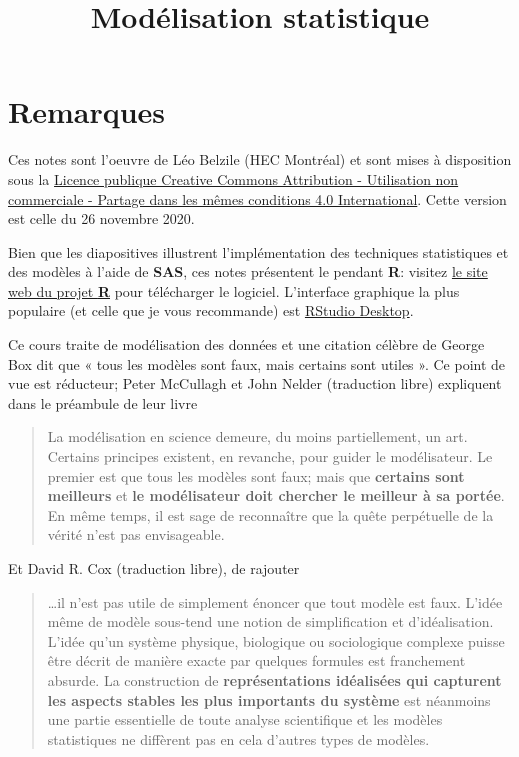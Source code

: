 \documentclass[
  11pt,
  letterpaper,
]{article}
\title{Modélisation statistique}
\author{}
\date{\vspace{-2.5em}}
\let\oldhref\href
\renewcommand{\href}[2]{#2\footnote{\url{#1}}}
\theoremstyle{definition}
\theoremstyle{definition}
\theoremstyle{definition}
\theoremstyle{remark}
\begin{document}
\maketitle

\let\href\oldhref

{
\setcounter{tocdepth}{2}
\tableofcontents
}
\hypertarget{remarques}{%
\section*{Remarques}\label{remarques}}

Ces notes sont l'oeuvre de Léo Belzile (HEC Montréal) et sont mises à disposition sous la \href{https://creativecommons.org/licenses/by-nc-sa/4.0/legalcode.fr}{Licence publique Creative Commons Attribution - Utilisation non commerciale - Partage dans les mêmes conditions 4.0 International}. Cette version est celle du 26 novembre 2020.

Bien que les diapositives illustrent l'implémentation des techniques statistiques et des modèles à l'aide de \textbf{SAS}, ces notes présentent le pendant \textbf{R}: visitez \href{https://cran.r-project.org/}{le site web du projet \textbf{R}} pour télécharger le logiciel. L'interface graphique la plus populaire (et celle que je vous recommande) est \href{https://www.rstudio.com/products/rstudio/download/}{RStudio Desktop}.

Ce cours traite de modélisation des données et une citation célèbre de George Box dit que « tous les modèles sont faux, mais certains sont utiles ». Ce point de vue est réducteur; Peter McCullagh et John Nelder (traduction libre) expliquent dans le préambule de leur livre

\begin{quote}
La modélisation en science demeure, du moins partiellement, un art. Certains principes existent, en revanche, pour guider le modélisateur. Le premier est que tous les modèles sont faux; mais que \textbf{certains sont meilleurs} et \textbf{le modélisateur doit chercher le meilleur à sa portée}. En même temps, il est sage de reconnaître que la quête perpétuelle de la vérité n'est pas envisageable.
\end{quote}

Et David R. Cox (traduction libre), de rajouter

\begin{quote}
\ldots il n'est pas utile de simplement énoncer que tout modèle est faux. L'idée même de modèle sous-tend une notion de simplification et d'idéalisation. L'idée qu'un système physique, biologique ou sociologique complexe puisse être décrit de manière exacte par quelques formules est franchement absurde. La construction de \textbf{représentations idéalisées qui capturent les aspects stables les plus importants du système} est néanmoins une partie essentielle de toute analyse scientifique et les modèles statistiques ne diffèrent pas en cela d'autres types de modèles.
\end{quote}
\end{document}
